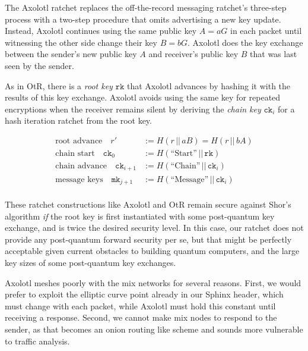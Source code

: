 \documentclass[twoside,letterpaper]{llncs}
\def\mathcomma{}
\begin{document}

\def\ck{\texttt{ck}}
\def\rk{\texttt{rk}}
\def\mk{\texttt{mk}}

The Axolotl ratchet \cite{TextSecure} replaces the off-the-record
messaging ratchet's three-step process with a two-step procedure
that omits advertising a new key update.  Instead, Axolotl continues
using the same public key $A = a G$ in each packet until witnessing
the other side change their key $B = b G$.  Axolotl does the key
exchange between the sender's new public key $A$ and receiver's
public key $B$ that was last seen by the sender.

As in OtR, there is a {\it root key} $\rk$ that Axolotl advances by
hashing it with the results of this key exchange.  Axolotl avoids using the same key for
repeated encryptions when the receiver remains silent by deriving the
{\it chain key} $\ck_i$ for a hash iteration ratchet from the root key.

\[ \begin{aligned}
\textrm{root advance}\quad
r' &:= H(r \,||\, a B) = H(r \,||\, b A) \\ %
\textrm{chain start}\quad
 \ck_0 &:= H(\textrm{``Start''} \,||\, \rk) \\
\textrm{chain advance}\quad
 \ck_{i+1} &:= H(\textrm{``Chain''} \,||\, \ck_i)  \\
\textrm{message keys}\quad
 \mk_{j+1} &:= H(\textrm{``Message''} \,||\, \ck_i)  \\
\end{aligned} \]

These ratchet constructions like Axolotl and OtR remain secure against
Shor's algorithm {\it if} the root key is first instantiated with some
post-quantum key exchange, and is twice the desired security level. 
In this case, our ratchet does not provide any post-quantum forward
security per se, but that might be perfectly acceptable given current
obstacles to building quantum computers, and the large key sizes of
some post-quantum key exchanges. 


Axolotl meshes poorly with the mix networks for several reasons.
%
First, we would prefer to exploit the elliptic curve point
 already in our Sphinx header, which must change with each packet,
while Axolotl must hold this constant until receiving a response.
%
Second, we cannot make mix nodes to respond to the sender, as that
becomes an onion routing like scheme and sounds more vulnerable to
traffic analysis.

\def\cn{\texttt{cn}}
\def\DH{\texttt{DH}}
\def\lk{\texttt{lk}}
\def\sk{\texttt{sk}}
\def\ECDH{\textrm{ECDH}}
\end{document}

